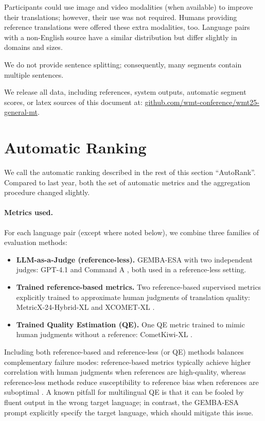 \documentclass[11pt]{article}
\begin{document}
Participants could use image and video modalities (when available) to improve their translations; however, their use was not required. Humans providing reference translations were offered these extra modalities, too.
Language pairs with a non-English source have a similar distribution but differ slightly in domains and sizes.

We do not provide sentence splitting; consequently, many segments contain multiple sentences.

We release all data, including references, system outputs, automatic segment scores, or latex sources of this document at: \href{https://github.com/wmt-conference/wmt25-general-mt}{github.com/wmt-conference/wmt25-general-mt}.


\section*{Automatic Ranking}
\label{sec:automatic-ranking}

We call the automatic ranking described in the rest of this section ``AutoRank''. %
Compared to last year, both the set of automatic metrics and the aggregation procedure changed slightly.

\paragraph{Metrics used.}
For each language pair (except where noted below), we combine three families of evaluation methods:
\begin{itemize}
    \item \textbf{LLM-as-a-Judge (reference-less).} GEMBA-ESA \citep{kocmi-federmann-2023-large} with two independent judges: GPT-4.1 \citep{openai_gpt41_2025} and Command A \citep{cohere2025commandaenterprisereadylarge}, both used in a reference-less setting.
    \item \textbf{Trained reference-based metrics.} Two reference-based supervised metrics explicitly trained to approximate human judgments of translation quality: MetricX-24-Hybrid-XL \citep{juraska-etal-2024-metricx} and XCOMET-XL \citep{guerreiro-etal-2024-xcomet}.
    \item \textbf{Trained Quality Estimation (QE).} One QE metric trained to mimic human judgments without a reference: CometKiwi-XL \citep{rei-etal-2023-scaling}.
\end{itemize}
Including both reference-based and reference-less (or QE) methods balances complementary failure modes: reference-based metrics typically achieve higher correlation with human judgments when references are high-quality, whereas reference-less methods reduce susceptibility to reference bias when references are suboptimal \citep{freitag-etal-2023-results}. A known pitfall for multilingual QE is that it can be fooled by fluent output in the wrong target language; in contrast, the GEMBA-ESA prompt explicitly specify the target language, which should mitigate this issue.
\end{document}
